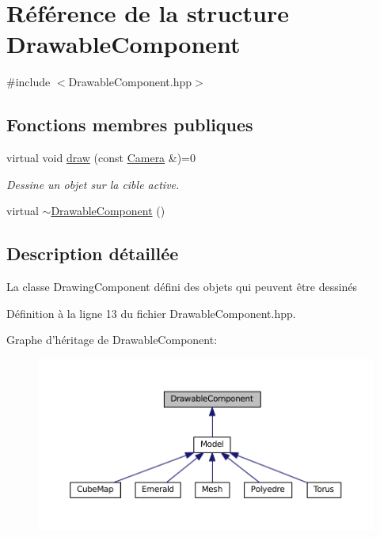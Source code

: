 \hypertarget{structDrawableComponent}{\section{Référence de la structure Drawable\+Component}
\label{structDrawableComponent}
}


{\ttfamily \#include $<$Drawable\+Component.\+hpp$>$}

\subsection*{Fonctions membres publiques}
\begin{DoxyCompactItemize}
\item 
virtual void \hyperlink{structDrawableComponent_ad1b6696a0f1ab135c9b2109450c75928}{draw} (const \hyperlink{classCamera}{Camera} \&)=0
\begin{DoxyCompactList}\small\item\em Dessine un objet sur la cible active. \end{DoxyCompactList}\item 
virtual \hyperlink{structDrawableComponent_a863e438d8d013b21dc44fcc38a89ca66}{$\sim$\+Drawable\+Component} ()
\end{DoxyCompactItemize}


\subsection{Description détaillée}
La classe Drawing\+Component défini des objets qui peuvent être dessinés 

Définition à la ligne 13 du fichier Drawable\+Component.\+hpp.



Graphe d'héritage de Drawable\+Component\+:
\nopagebreak
\begin{figure}[H]
\begin{center}
\leavevmode
\includegraphics[width=350pt]{structDrawableComponent__inherit__graph}
\end{center}
\end{figure}


